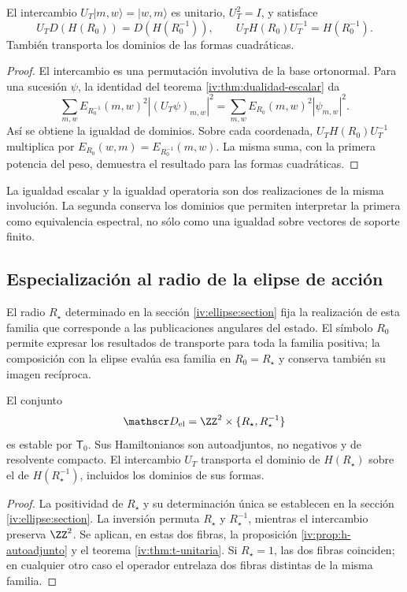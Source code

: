 \begin{theorem}
\label{iv:thm:t-unitaria}
\label{prop:dualidad-radios-k}
El intercambio
\(U_T|m,w\rangle=|w,m\rangle\) es unitario,
\(U_T^2=I\), y satisface
\begin{equation}
 U_TD(H(R_0))=D(H(R_0^{-1})),
 \qquad U_TH(R_0)U_T^{-1}=H(R_0^{-1}).
 \label{iv:eq:conjugacion-h}
\end{equation}
También transporta los dominios de las formas cuadráticas.
\end{theorem}
\begin{proof}
El intercambio es una permutación involutiva de la base
ortonormal. Para una sucesión \(\psi\), la identidad del
teorema \ref{iv:thm:dualidad-escalar} da
\[
 \sum_{m,w}E_{R_0^{-1}}(m,w)^2|(U_T\psi)_{m,w}|^2
 =\sum_{m,w}E_{R_0}(m,w)^2|\psi_{m,w}|^2.
\]
Así se obtiene la igualdad de dominios. Sobre cada coordenada,
\(U_TH(R_0)U_T^{-1}\) multiplica por
\(E_{R_0}(w,m)=E_{R_0^{-1}}(m,w)\). La misma suma, con
la primera potencia del peso, demuestra el resultado para las
formas cuadráticas.
\end{proof}

La igualdad escalar y la igualdad operatoria son dos realizaciones
de la misma involución. La segunda conserva los dominios que
permiten interpretar la primera como equivalencia espectral,
no sólo como una igualdad sobre vectores de soporte finito.

\subsection{Especialización al radio de la elipse de acción}

El radio \(R_\star\) determinado en la sección
\ref{iv:ellipse:section} fija la realización de esta familia que
corresponde a las publicaciones angulares del estado. El símbolo
\(R_0\) permite expresar los resultados de transporte para toda la
familia positiva; la composición con la elipse evalúa esa familia en
\(R_0=R_\star\) y conserva también su imagen recíproca.

\begin{corollary}
\label{iv:cor:radio-especializado}
El conjunto
\[
 \mathscr D_{\mathrm{el}}
 =\ZZ^2\times\{R_\star,R_\star^{-1}\}
\]
es estable por \(\mathsf T_0\). Sus Hamiltonianos son autoadjuntos,
no negativos y de resolvente compacto. El intercambio \(U_T\)
transporta el dominio de \(H(R_\star)\) sobre el de
\(H(R_\star^{-1})\), incluidos los dominios de sus formas.
\end{corollary}
\begin{proof}
La positividad de \(R_\star\) y su determinación única se establecen
en la sección \ref{iv:ellipse:section}. La inversión permuta
\(R_\star\) y \(R_\star^{-1}\), mientras el intercambio preserva
\(\ZZ^2\). Se aplican, en estas dos fibras, la proposición
\ref{iv:prop:h-autoadjunto} y el teorema \ref{iv:thm:t-unitaria}.
Si \(R_\star=1\), las dos fibras coinciden; en cualquier otro caso
el operador entrelaza dos fibras distintas de la misma familia.
\end{proof}

